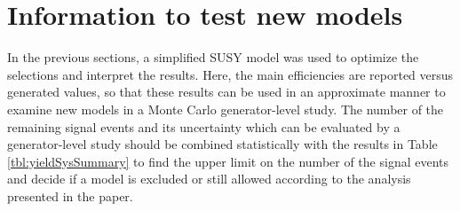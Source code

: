 \section{Information to test new models}
\label{sect:model}
In the previous sections, a simplified SUSY model was used to optimize the selections and interpret the results. 
Here, the main efficiencies are reported versus generated values, so that these results can be used in an approximate manner to examine new models in a Monte Carlo generator-level study.
The number of the remaining signal events and its uncertainty which can be evaluated by a generator-level study 
should be combined statistically with the results in Table \ref{tbl:yieldSysSummary} to find the upper limit 
on the number of the signal events
and decide if a model is excluded or still allowed according to  the analysis presented in the paper.

